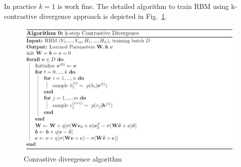 \begin{spacing}{1.5}
In practice $k=1$ is work fine. The detailed algorithm to train RBM using  k-contrastive divergence approach is depicted in Fig.~\ref{fig:Conrastive_divergence_algo}.




\begin{figure}[h]
    \centering
    \includegraphics[scale=0.65]{Chapters/Figures/lect_20_slide_60_Conrastive_divergence_algo.JPG}
    \caption{Conrastive divergence algorithm}
    \label{fig:Conrastive_divergence_algo}
\end{figure}










\end{spacing} 